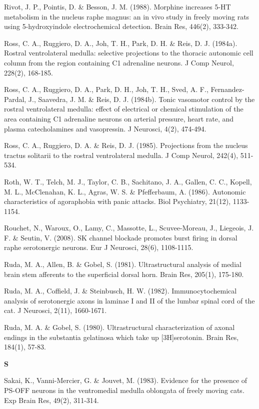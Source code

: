 \documentclass[a4paper,12pt,twoside]{report}
\begin{document}
\begin{singlespacing}
\begin{footnotesize}
Rivot, J. P., Pointis, D. \& Besson, J. M. (1988). Morphine increases 5-HT metabolism in the nucleus raphe magnus: an in vivo study in freely moving rats using 5-hydroxyindole electrochemical detection. Brain Res, 446(2), 333-342.

Ross, C. A., Ruggiero, D. A., Joh, T. H., Park, D. H. \& Reis, D. J. (1984a). Rostral ventrolateral medulla: selective projections to the thoracic autonomic cell column from the region containing C1 adrenaline neurons. J Comp Neurol, 228(2), 168-185.

Ross, C. A., Ruggiero, D. A., Park, D. H., Joh, T. H., Sved, A. F., Fernandez-Pardal, J., Saavedra, J. M. \& Reis, D. J. (1984b). Tonic vasomotor control by the rostral ventrolateral medulla: effect of electrical or chemical stimulation of the area containing C1 adrenaline neurons on arterial pressure, heart rate, and plasma catecholamines and vasopressin. J Neurosci, 4(2), 474-494.

Ross, C. A., Ruggiero, D. A. \& Reis, D. J. (1985). Projections from the nucleus tractus solitarii to the rostral ventrolateral medulla. J Comp Neurol, 242(4), 511-534.

Roth, W. T., Telch, M. J., Taylor, C. B., Sachitano, J. A., Gallen, C. C., Kopell, M. L., McClenahan, K. L., Agras, W. S. \& Pfefferbaum, A. (1986). Autonomic characteristics of agoraphobia with panic attacks. Biol Psychiatry, 21(12), 1133-1154.

Rouchet, N., Waroux, O., Lamy, C., Massotte, L., Scuvee-Moreau, J., Liegeois, J. F. \& Seutin, V. (2008). SK channel blockade promotes burst firing in dorsal raphe serotonergic neurons. Eur J Neurosci, 28(6), 1108-1115.

Ruda, M. A., Allen, B. \& Gobel, S. (1981). Ultrastructural analysis of medial brain stem afferents to the superficial dorsal horn. Brain Res, 205(1), 175-180.

Ruda, M. A., Coffield, J. \& Steinbusch, H. W. (1982). Immunocytochemical analysis of serotonergic axons in laminae I and II of the lumbar spinal cord of the cat. J Neurosci, 2(11), 1660-1671.

Ruda, M. A. \& Gobel, S. (1980). Ultrastructural characterization of axonal endings in the substantia gelatinosa which take up [3H]serotonin. Brain Res, 184(1), 57-83.

\medskip
\begin{Large}\textbf{S}\end{Large}

Sakai, K., Vanni-Mercier, G. \& Jouvet, M. (1983). Evidence for the presence of PS-OFF neurons in the ventromedial medulla oblongata of freely moving cats. Exp Brain Res, 49(2), 311-314.


\end{footnotesize}
\end{singlespacing}
\end{document}
